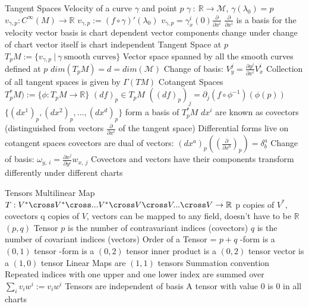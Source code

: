 \documentclass[14pt]{extarticle}
\begin{document}
\begin{outline}
		\1	Tangent Spaces
			\2	Velocity of a curve $\gamma$ and point $p$ 
				\3	$\gamma~:~\mathbb{R} \rightarrow \mathcal{M}$, $\gamma(\lambda_0) = p$
				\3	$v_{\gamma,p} : C^{\infty}(M) \rightarrow \mathbb{R}$	
				\3	$v_{\gamma,p} := (f \circ \gamma)'(\lambda_0)$
				\3	$v_{\gamma,p} = \gamma_x^i(0) \frac{\partial}{\partial x^i}$
					\4	$\frac{\partial}{\partial x^i}$ is a basis for the velocity vector
					\4	basis is chart dependent
					\4	vector components change under change of chart
					\4	vector itself is chart independent
			\2	Tangent Space at $p$
				\3	$T_pM := \{v_{\gamma,p}~|~\gamma~\text{smooth curves}\}$ 
				\3	Vector space spanned by all the smooth curves defined at $p$
				\3	$dim(T_pM) = d = dim(\mathcal{M})$
				\3	Change of basis: $V^j_y = \frac{\partial y^j}{\partial x^i}V^i_x$
				\3	Collection of all tangent spaces is given by $\Gamma(TM)$
			\2	Cotangent Spaces
				\3	$T^*_pM) := \{\phi : T_pM \rightarrow \mathbb{R}\}$
				\3	$(df)_p \in T_pM$
				\3	$((df)_p)_j = \partial_j(f \circ \phi^{-1})(\phi(p))$
				\3	$\{(dx^1)_p, (dx^2)_p,...,(dx^d)_p\}$ form a basis of $T^*_pM$
				\3	$dx^i$ are known as covectors (distinguished from vectors $\frac{\partial}{\partial x^i}$ of the tangent space)
				\3	Differential forms live on cotangent spaces
				\3	covectors are dual of vectors: $(dx^a)_p((\frac{\partial}{\partial x^b})_p) = \delta_b^a$
				\3	Change of basis:	$\omega_{y,~i} = \frac{\partial x^j}{\partial y^i}w_{x,~j}$
				\3	Covectors and vectors have their components transform differently under different charts
		
		\1	Tensors
			\2	Multilinear Map $T: V^* \cross V^* \cross ... V^* \cross V \cross V ... \cross V \rightarrow \mathbb{R}$
				\3	p copies of $V^*$, covectors
				\3	q copies of $V$, vectors
				\3	can be mapped to any field, doesn't have to be $\mathbb{R}$
			\2	$(p,q)$ Tensor
				\3	$p$ is the number of contravariant indices (covectors)
				\3	$q$ is the number of covariant indices (vectors)
				\3	Order of a Tensor = $p + q$
				-form is a $(0,1)$ tensor
				-form is a $(0,2)$ tensor
				\3	inner product is a $(0,2)$ tensor
				\3	vector is a $(1,0)$ tensor
				\3	Linear Maps are $(1,1)$ tensors
			\2	Summation convention
				\3	Repeated indices with one upper and one lower index are summed over
				\3	$\sum_i v_i w^i := v_iw^i$
			\2	Tensors are independent of basis
				\3	A tensor with value $0$ is $0$ in all charts


\end{outline}
\end{document}
